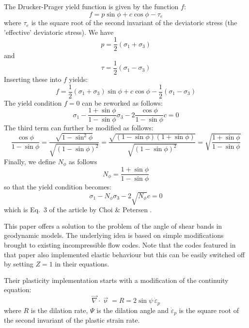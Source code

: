 The Drucker-Prager yield function is given by the function $f$:
\[
f = p \sin\phi + c\cos \phi - \tau_e
\]
where $\tau_e$ is the square root of the second invariant of the deviatoric stress
(the 'effective' deviatoric stress).
We have
\[
p=\frac{1}{2}(\sigma_1+\sigma_3) 
\]
and 
\[
\tau = \frac{1}{2}(\sigma_1-\sigma_3)
\]
Inserting these into $f$ yields:
\[
f= \frac{1}{2}(\sigma_1+\sigma_3) \sin\phi + c \cos\phi - \frac{1}{2}(\sigma_1-\sigma_3)
\]
The yield condition $f=0$ can be reworked as follows:
\[
\sigma_1 - \frac{1 + \sin\phi}{1-\sin\phi} \sigma_3 - 2 \frac{\cos \phi}{1-\sin\phi} c = 0
\]
The third term can further be modified as follows:
\[
\frac{\cos \phi}{1-\sin\phi}
=\frac{\sqrt{1-\sin^2 \phi}}{\sqrt{(1-\sin\phi)^2}}
=\frac{\sqrt{(1-\sin \phi)(1+\sin\phi)}}{\sqrt{(1-\sin\phi)^2}}
=\sqrt{
\frac{1+\sin\phi}{1-\sin\phi}
}
\]
Finally, we define $N_\phi$ as follows 
\[
N_\phi=\frac{1+\sin \phi}{1-\sin\phi}
\]
so that the yield condition becomes:
\[
\sigma_1 - N_\phi \sigma_3 - 2 \sqrt{N_\phi} c = 0
\]
which is Eq.~3 of the article by Choi \& Petersen \cite{chpe15}.

\vspace{1cm}

This paper offers a solution to the problem of the angle of shear bands in 
geodynamic models. The underlying idea is based on simple modifications 
brought to existing incompressible flow codes. Note that the codes
featured in that paper also implemented elastic behaviour but this can 
be easily switched off by setting $Z=1$ in their equations.

Their plasticity implementation starts with a modification of the 
continuity equation:
\[
\vec\nabla\cdot\vec\upnu = R = 2 \sin\psi \, \dot{\varepsilon}_p
\]
where $R$ is the dilation rate, $\Psi$ is the dilation angle 
and $\dot{\varepsilon}_p$ is the square root of 
the second invariant of the plastic strain rate.

